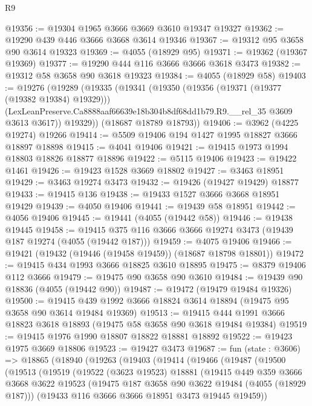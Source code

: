 \begin{lexlean}{R9}
\begin{coremodule}
@19356 := @19304 @1965 @3666 @3669 @3610 @19347 @19327
@19362 := @19290 @439 @446 @3666 @3668 @3614 @19346
@19367 := @19312 @95 @3658 @90 @3614 @19323
@19369 := @4055 (@18929 @95)
@19371 := @19362 (@19367 @19369)
@19377 := @19290 @444 @116 @3666 @3666 @3618 @3473
@19382 := @19312 @58 @3658 @90 @3618 @19323
@19384 := @4055 (@18929 @58)
@19403 := @19276
    (@19289
      (@19335
        (@19341
          (@19350
            (@19356 (@19371 (@19377 (@19382 @19384) @19329)))
            (LexLeanPreserve.Ca8888aaf66639e18b304b8df68dd1b79.R9.__rel_35 @3609 @3613 @3617))
          @19329))
      (@18687 @18789 @18793))
@19406 := @3962 (@4225 @19274) @19266
@19414 := @5509 @19406 @194 @1427 @1995 @18827 @3666 @18897 @18898
@19415 := @4041 @19406
@19421 := @19415 @1973 @1994 @18803 @18826 @18877 @18896
@19422 := @5115 @19406
@19423 := @19422 @1461
@19426 := @19423 @1528 @3669 @18802
@19427 := @3463 @18951
@19429 := @3463 @19274 @3473
@19432 := @19426 (@19427 @19429) @18877
@19433 := @19415 @136
@19438 := @19433 @1527 @3666 @3668 @18951 @19429
@19439 := @4050 @19406
@19441 := @19439 @58 @18951
@19442 := @4056 @19406
@19445 := @19441 (@4055 (@19442 @58))
@19446 := @19438 @19445
@19458 := @19415 @375 @116 @3666 @3666 @19274 @3473 (@19439 @187 @19274 (@4055 (@19442 @187)))
@19459 := @4075 @19406
@19466 := @19421 (@19432 (@19446 (@19458 @19459)) (@18687 @18798 @18801))
@19472 := @19415 @434 @1993 @3666 @18825 @3610 @18895
@19475 := @8379 @19406 @112 @3666
@19479 := @19475 @90 @3658 @90 @3610
@19484 := @19439 @90 @18836 (@4055 (@19442 @90))
@19487 := @19472 (@19479 @19484 @19326)
@19500 := @19415 @439 @1992 @3666 @18824 @3614 @18894 (@19475 @95 @3658 @90 @3614 @19484 @19369)
@19513 := @19415 @444 @1991 @3666 @18823 @3618 @18893 (@19475 @58 @3658 @90 @3618 @19484 @19384)
@19519 := @19415 @1976 @1990 @18807 @18822 @18881 @18892
@19522 := @19423 @1975 @3669 @18806
@19523 := @19427 @3473
@19687 := fun (state : @3606) =>
  @18865
    (@18940
      (@19263
        (@19403
          (@19414
            (@19466
              (@19487
                (@19500
                  (@19513
                    (@19519
                      (@19522
                        (@3623 @19523)
                        @18881
                        (@19415
                          @449
                          @359
                          @3666
                          @3668
                          @3622
                          @19523
                          (@19475 @187 @3658 @90 @3622 @19484 (@4055 (@18929 @187)))
                          (@19433 @116 @3666 @3666 @18951 @3473 @19445 @19459))

\end{coremodule}
\end{lexlean}
